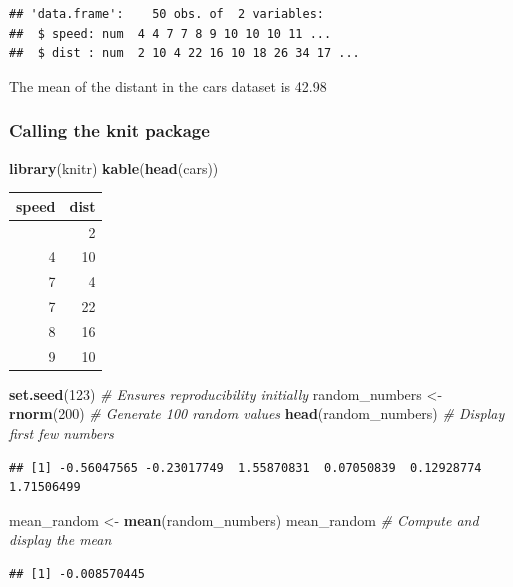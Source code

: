 \documentclass[
]{article}
\newenvironment{Shaded}{\begin{snugshade}}{\end{snugshade}}
\newcommand{\CommentTok}[1]{\textcolor[rgb]{0.56,0.35,0.01}{\textit{#1}}}
\newcommand{\DecValTok}[1]{\textcolor[rgb]{0.00,0.00,0.81}{#1}}
\newcommand{\FunctionTok}[1]{\textcolor[rgb]{0.13,0.29,0.53}{\textbf{#1}}}
\newcommand{\NormalTok}[1]{#1}
\newcommand{\OtherTok}[1]{\textcolor[rgb]{0.56,0.35,0.01}{#1}}
\begin{document}
\begin{verbatim}
## 'data.frame':    50 obs. of  2 variables:
##  $ speed: num  4 4 7 7 8 9 10 10 10 11 ...
##  $ dist : num  2 10 4 22 16 10 18 26 34 17 ...
\end{verbatim}

The mean of the distant in the cars dataset is 42.98

\subsubsection{Calling the knit package}\label{calling-the-knit-package}

\begin{Shaded}
\begin{Highlighting}[]
\FunctionTok{library}\NormalTok{(knitr)}
\FunctionTok{kable}\NormalTok{(}\FunctionTok{head}\NormalTok{(cars))}
\end{Highlighting}
\end{Shaded}

\begin{longtable}[]{@{}rr@{}}
\toprule\noalign{}
speed & dist \\
\midrule\noalign{}
\endhead
\bottomrule\noalign{}
\endlastfoot
4 & 2 \\
4 & 10 \\
7 & 4 \\
7 & 22 \\
8 & 16 \\
9 & 10 \\
\end{longtable}

\begin{Shaded}
\begin{Highlighting}[]
\FunctionTok{set.seed}\NormalTok{(}\DecValTok{123}\NormalTok{)  }\CommentTok{\# Ensures reproducibility initially}
\NormalTok{random\_numbers }\OtherTok{\textless{}{-}} \FunctionTok{rnorm}\NormalTok{(}\DecValTok{200}\NormalTok{)  }\CommentTok{\# Generate 100 random values}
\FunctionTok{head}\NormalTok{(random\_numbers)  }\CommentTok{\# Display first few numbers}
\end{Highlighting}
\end{Shaded}

\begin{verbatim}
## [1] -0.56047565 -0.23017749  1.55870831  0.07050839  0.12928774  1.71506499
\end{verbatim}

\begin{Shaded}
\begin{Highlighting}[]
\NormalTok{mean\_random }\OtherTok{\textless{}{-}} \FunctionTok{mean}\NormalTok{(random\_numbers)}
\NormalTok{mean\_random  }\CommentTok{\# Compute and display the mean}
\end{Highlighting}
\end{Shaded}

\begin{verbatim}
## [1] -0.008570445
\end{verbatim}
\end{document}
